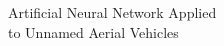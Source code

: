 \documentclass[preview]{standalone}
\begin{document}
\begin{center}
Artificial Neural Network Applied \\ to Unnamed Aerial Vehicles
\end{center}
\end{document}
